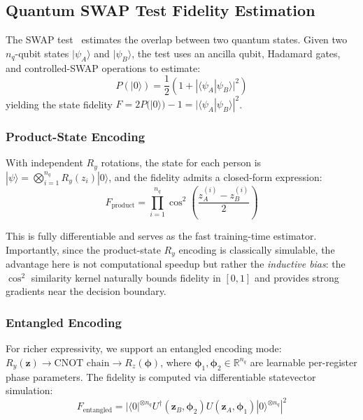 \documentclass[journal,12pt]{IEEEtran}
\begin{document}
\subsection{Quantum SWAP Test Fidelity Estimation}
\label{sec:swap_test}

The SWAP test~\cite{buhrman2001quantum} estimates the overlap between two
quantum states. Given two $n_q$-qubit states $|\psi_A\rangle$ and
$|\psi_B\rangle$, the test uses an ancilla qubit, Hadamard gates, and
controlled-SWAP operations to estimate:
\begin{equation}
    P(|0\rangle) = \frac{1}{2}\left(1 + |\langle\psi_A|\psi_B\rangle|^2\right)
\end{equation}
yielding the state fidelity $F = 2P(|0\rangle) - 1 = |\langle\psi_A|
\psi_B\rangle|^2$.

\subsubsection{Product-State Encoding}
With independent $R_y$ rotations, the state for each person is
$|\psi\rangle = \bigotimes_{i=1}^{n_q} R_y(z_i)|0\rangle$, and the
fidelity admits a closed-form expression:
\begin{equation}
    F_{\text{product}} = \prod_{i=1}^{n_q} \cos^2\!\left(\frac{z_A^{(i)} - z_B^{(i)}}{2}\right)
    \label{eq:product_fidelity}
\end{equation}

This is fully differentiable and serves as the fast training-time
estimator. Importantly, since the product-state $R_y$ encoding is
classically simulable, the advantage here is not computational speedup
but rather the \emph{inductive bias}: the $\cos^2$ similarity kernel
naturally bounds fidelity in $[0,1]$ and provides strong gradients near
the decision boundary.

\subsubsection{Entangled Encoding}
For richer expressivity, we support an entangled encoding mode:
$R_y(\mathbf{z}) \to \text{CNOT chain} \to R_z(\bm{\phi})$, where
$\bm{\phi}_1, \bm{\phi}_2 \in \mathbb{R}^{n_q}$ are learnable per-register
phase parameters. The fidelity is computed via differentiable statevector
simulation:
\begin{equation}
    F_{\text{entangled}} = |\langle 0|^{\otimes n_q} U^\dagger(\mathbf{z}_B, \bm{\phi}_2)
    U(\mathbf{z}_A, \bm{\phi}_1)|0\rangle^{\otimes n_q}|^2
    \label{eq:entangled_fidelity}
\end{equation}
\end{document}
